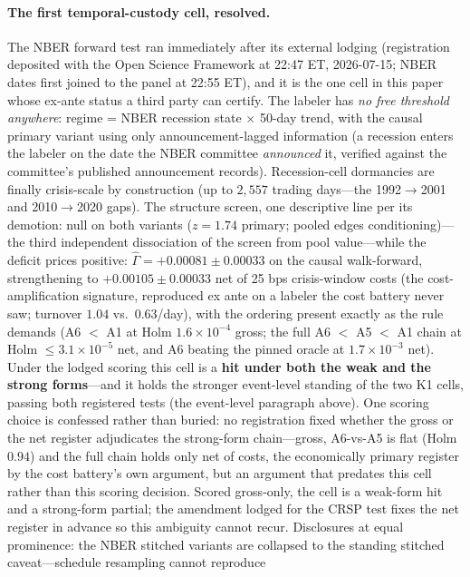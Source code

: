 \documentclass{article}
\begin{document}
\paragraph{The first temporal-custody cell, resolved.} The NBER
forward test ran immediately after its external lodging (registration
deposited with the Open Science Framework at 22:47 ET, 2026-07-15;
NBER dates first joined to the panel at 22:55 ET), and it is the one
cell in this paper whose ex-ante status a third party can certify. The
labeler has \emph{no free threshold anywhere}: regime = NBER recession
state $\times$ 50-day trend, with the causal primary variant using
only announcement-lagged information (a recession enters the labeler
on the date the NBER committee \emph{announced} it, verified against
the committee's published announcement records). Recession-cell
dormancies are finally crisis-scale by construction (up to $2{,}557$
trading days---the 1992${\to}$2001 and 2010${\to}$2020 gaps). The
structure screen, one descriptive line per its demotion: null on
both variants ($z = 1.74$ primary; pooled edges conditioning)---the
third independent dissociation of the screen from
pool value---while the deficit prices positive:
$\hat\Gamma = +0.00081 \pm 0.00033$ on the causal walk-forward,
strengthening to $+0.00105 \pm 0.00033$ net of 25 bps crisis-window
costs (the cost-amplification signature, reproduced ex ante on a
labeler the cost battery never saw; turnover $1.04$ vs.\ $0.63$/day),
with the ordering present exactly as the rule demands (A6 $<$ A1 at
Holm $1.6\times10^{-4}$ gross; the full A6 $<$ A5 $<$ A1 chain at
Holm $\le 3.1\times10^{-5}$ net, and A6 beating the pinned oracle at
$1.7\times10^{-3}$ net). Under the lodged scoring this cell is a
\textbf{hit under both the weak and the strong forms}---and it holds
the stronger event-level standing of the two K1 cells, passing both
registered tests (the event-level paragraph above). One scoring
choice is confessed rather than buried: no registration fixed whether
the gross or the net register adjudicates the strong-form
chain---gross, A6-vs-A5 is flat (Holm $0.94$) and the full chain holds
only net of costs, the economically primary register by the cost
battery's own argument, but an argument that predates this cell rather
than this scoring decision. Scored gross-only, the cell is a weak-form
hit and a strong-form partial; the amendment lodged for the CRSP test
fixes the net register in advance so this ambiguity cannot recur.
Disclosures at
equal prominence: the NBER stitched variants are collapsed to the
standing stitched caveat---schedule resampling cannot reproduce
\end{document}
